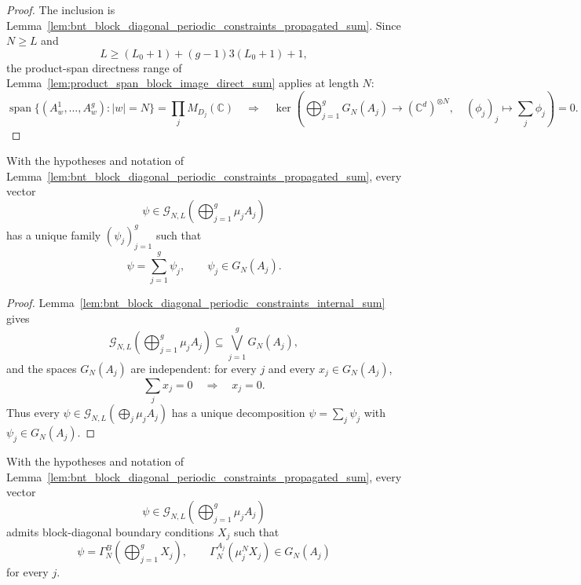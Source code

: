 \begin{proof}
    \leanok
    The inclusion is
    Lemma~\ref{lem:bnt_block_diagonal_periodic_constraints_propagated_sum}. Since
    $N\ge L$ and
    \[
        L\ge (L_0+1)+(g-1)3(L_0+1)+1,
    \]
    the product-span directness range of
    Lemma~\ref{lem:product_span_block_image_direct_sum} applies at length
    $N$:
    \[
        \operatorname{span}\{(A^1_w,\ldots,A^g_w): |w|=N\}
        =
        \prod_j M_{D_j}(\mathbb C)
        \quad\Longrightarrow\quad
        \ker\!\left(
        \bigoplus_{j=1}^g G_N(A_j)
        \longrightarrow (\mathbb C^d)^{\otimes N},
        \quad
        (\phi_j)_j\longmapsto \sum_j\phi_j
        \right)=0.
    \]
\end{proof}

\begin{lemma}
    \label{lem:bnt_block_diagonal_open_boundary_decomposition}
    \leanok
    With the hypotheses and notation of
    Lemma~\ref{lem:bnt_block_diagonal_periodic_constraints_propagated_sum}, every
    vector
    \[
        \psi\in
        \mathcal G_{N,L}\!\left(\bigoplus_{j=1}^g\mu_jA_j\right)
    \]
    has a unique family \((\psi_j)_{j=1}^g\) such that
    \[
        \psi=\sum_{j=1}^g\psi_j,
        \qquad
        \psi_j\in G_N(A_j).
    \]
\end{lemma}

\begin{proof}
    \leanok
    Lemma~\ref{lem:bnt_block_diagonal_periodic_constraints_internal_sum} gives
    \[
        \mathcal G_{N,L}\!\left(\bigoplus_{j=1}^g\mu_jA_j\right)
        \subseteq
        \bigvee_{j=1}^g G_N(A_j),
    \]
    and the spaces \(G_N(A_j)\) are independent: for every \(j\) and every
    \(x_j\in G_N(A_j)\),
    \[
        \sum_j x_j=0
        \quad\Longrightarrow\quad
        x_j=0.
    \]
    Thus every
    \(\psi\in\mathcal G_{N,L}(\bigoplus_j\mu_jA_j)\) has a unique
    decomposition \(\psi=\sum_j\psi_j\) with \(\psi_j\in G_N(A_j)\).
\end{proof}

\begin{lemma}
    \label{lem:bnt_block_diagonal_open_boundary_matrices}
    \leanok
    With the hypotheses and notation of
    Lemma~\ref{lem:bnt_block_diagonal_periodic_constraints_propagated_sum}, every
    vector
    \[
        \psi\in
        \mathcal G_{N,L}\!\left(\bigoplus_{j=1}^g\mu_jA_j\right)
    \]
    admits block-diagonal boundary conditions \(X_j\) such that
    \[
        \psi=\Gamma_N^B\!\left(\bigoplus_{j=1}^gX_j\right),
        \qquad
        \Gamma_N^{A_j}(\mu_j^NX_j)\in G_N(A_j)
    \]
    for every \(j\).
\end{lemma}

